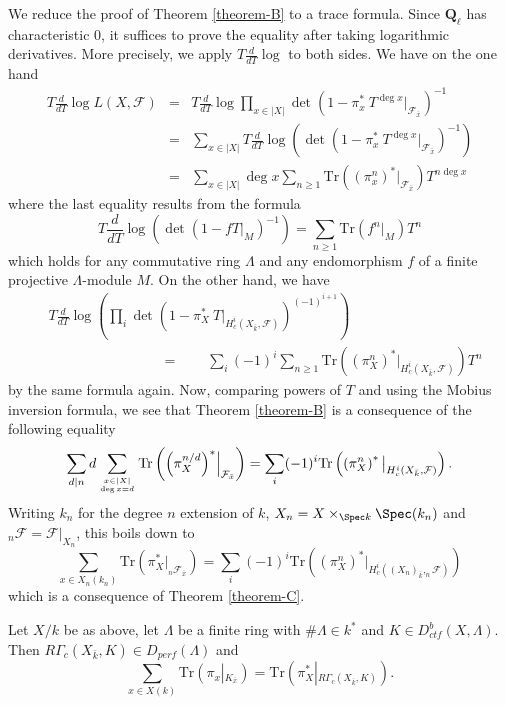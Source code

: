 \noindent
We reduce the proof of Theorem \ref{theorem-B} to a trace formula. Since
$\mathbf{Q}_\ell$ has characteristic 0, it suffices to prove the equality after
taking logarithmic derivatives. More precisely, we apply $T\frac{d}{dT} \log $
to both sides. We have on the one hand
\begin{eqnarray*}
T\frac{d}{dT}\log L(X, \mathcal{F}) & = &
T\frac{d}{dT} \log \prod_{x\in |X|} \det\left(1-\pi_x^*\ T^{\deg
x}\Big|_{\mathcal{F}_{\bar x}}\right)^{-1}\\
& = & \sum_{x\in |X|} T\frac{d}{dT} \log \left( \det\left(1-\pi_x^*\ T^{\deg
x}\Big|_{\mathcal{F}_{\bar x}}\right)^{-1}\right) \\
&= & \sum_{x \in |X|} \deg x\sum_{n \geq 1}
\text{Tr}\left({\left(\pi_x^n\right)}^*\big|_{\mathcal{F}_{\bar x}}\right)
T^{n\deg x}
\end{eqnarray*}
where the last equality results from the formula
$$
T\frac{d}{dT}\log\left(\det\left(1-fT|_M\right)^{-1}\right) = \sum_{n\geq 1}
\text{Tr}(f^n|_M)T^n
$$
which holds for any commutative ring $\Lambda$ and any endomorphism $f$ of a
finite projective $\Lambda$-module $M$. On the other hand, we have
\begin{align*}
&T\frac{d}{dT} \log\left(\prod_i \det\left(1-\pi_X^*\
T\Big|_{H_c^i\left(X_{\bar k} , \mathcal{F}\right)}\right)^{(-1)^{i+1}}\right)
\\
&\qquad\qquad\qquad \qquad = \qquad
\sum_i (-1)^i \sum_{n\geq 1}
\text{Tr}\left({\left(\pi_X^n\right)}^*\big|_{H_c^i(X_{\bar k},
\mathcal{F})}\right) T^n
\end{align*}
by the same formula again. Now, comparing powers of $T$ and using the Mobius
inversion formula, we see that Theorem \ref{theorem-B} is a consequence of the
following equality
$$
\sum_{d | n} d \sum_{x\in |X| \atop \deg x = d} \text{Tr} \left( {\left(
\pi_X^{n/d} \right)}^* \Big|_{\mathcal{F}_{\bar x}} \right)
=
\sum_i (-1)^i \text{Tr}\left(\left(\pi^n_X\right)^*\big|_{H^i_c(X_{\bar k},
\mathcal{F})} \right).
$$
Writing $k_n$ for the degree $n$ extension of $k$, $X_n = X \times_{\Spec
k} \Spec(k_n)$ and $_n \mathcal{F} = \mathcal{F}|_{X_n}$, this boils down
to
$$
\sum_{x \in X_n(k_n)} \text{Tr}\left( \pi_X^*\big|_{_n\mathcal{F}_{\bar x}}
\right)
=
\sum_i (-1)^i \text{Tr}\left(\left(\pi^n_X\right)^*\big|_{H^i_c({(X_n)}_{\bar
k}, _n\mathcal{F})} \right)
$$
which is a consequence of Theorem \ref{theorem-C}.



\begin{theorem}
\label{theorem-D}
Let $X/k$ be as above, let $\Lambda$ be a finite ring with $\#\Lambda \in k^*$
and $K\in D_{ctf}^b(X, \Lambda)$. Then $R\Gamma_c(X_{\bar k}, K)\in
D_{perf}(\Lambda)$ and
$$
\sum_{x\in X(k)}\text{Tr}\left(\pi_x\left|_{K_{\bar x}}\right.\right) =
\text{Tr}\left(\pi_X^*\left|_{R\Gamma_c(X_{\bar k}, K )}\right.\right).
$$
\end{theorem}

